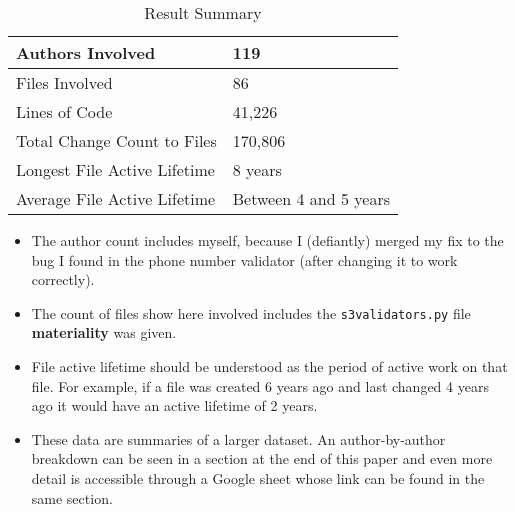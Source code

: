 \documentclass[a4paper,man,natbib,floatsintext]{apa6}
\begin{document}


  \begin{table}[ht]
  \caption{Result Summary}
  \label{tab:result-summary}
  \begin{tabular}{|l|l|}
  \hline
  Authors Involved               & 119                                   \\ \hline
  Files Involved                 & 86                                    \\ \hline
  Lines of Code                  & 41,226                                \\ \hline
  Total Change Count to Files    & 170,806                               \\ \hline
  Longest File Active Lifetime   & 8 years                               \\ \hline
  Average File Active Lifetime   & Between 4 and 5 years                 \\ \hline
  \end{tabular}
\end{table}
  
  \begin{itemize}
    \item The author count includes myself, because I (defiantly) merged my fix to the bug I found in the phone number validator (after changing it to work correctly).
    \item The count of files show here involved includes the \verb|s3validators.py| file \textbf{materiality} was given. 
    \item File active lifetime should be understood as the period of active work on that file. For example, if a file was created 6 years ago and last changed 4 years ago it would have an active lifetime of 2 years.
    \item These data are summaries of a larger dataset. An author-by-author breakdown can be seen in a section at the end of this paper and even more detail is accessible through a Google sheet whose link can be found in the same section.
  \end{itemize}
  
\end{document}
